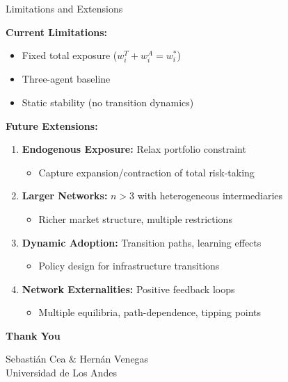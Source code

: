 \documentclass[aspectratio=169]{beamer}
\begin{document}
\begin{frame}{Limitations and Extensions}
    
    \textbf{Current Limitations:}
    \begin{itemize}
        \item Fixed total exposure ($w_i^T + w_i^A = w_i^*$)
        \item Three-agent baseline 
        \item Static stability (no transition dynamics)
    \end{itemize}
    
    \vspace{0.3cm}
    \textbf{Future Extensions:}
    \begin{enumerate}
        \item \textbf{Endogenous Exposure:} Relax portfolio constraint
        \begin{itemize}
            \item Capture expansion/contraction of total risk-taking
        \end{itemize}
        
        \item \textbf{Larger Networks:} $n > 3$ with heterogeneous intermediaries
        \begin{itemize}
            \item Richer market structure, multiple restrictions
        \end{itemize}
        
        \item \textbf{Dynamic Adoption:} Transition paths, learning effects
        \begin{itemize}
            \item Policy design for infrastructure transitions
        \end{itemize}
        
        \item \textbf{Network Externalities:} Positive feedback loops
        \begin{itemize}
            \item Multiple equilibria, path-dependence, tipping points
        \end{itemize}
    \end{enumerate}

\end{frame}

\begin{frame}
    \centering
    \Huge \textbf{Thank You}

    \vspace{0.3cm}
        
    \normalsize
    Sebastián Cea \& Hernán Venegas \\
    Universidad de Los Andes
    
    

\end{frame}
\end{document}
